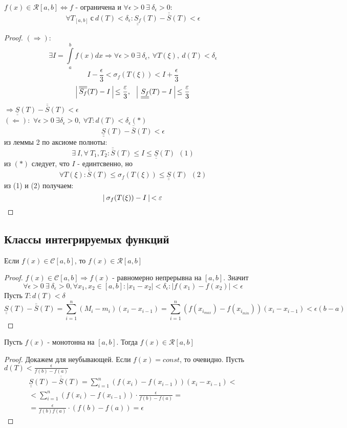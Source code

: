 \begin{theorem}
    $f(x)\in \mathcal{R}[a,b] \Leftrightarrow f$ - ограничена и $\forall \epsilon>0\ \exists\ \delta_{\epsilon}>0:$
    \[\forall T_{[a,b]}\ \text{с}\ d(T)<\delta_{\epsilon}: \underline{\underline{S_f}}(T)-\overline{\overline{S}}(T)<\epsilon\]
\end{theorem} 
\begin{proof}
    $(\Rightarrow):$
    \[\exists I=\int\limits_{a}^{b}f(x)dx \Rightarrow \forall \epsilon>0\ \exists\ \delta_{\epsilon},\ \forall T(\xi),\ d(T)<\delta_{\epsilon}\]
    \[I-\frac{\epsilon}{3}<\sigma_f(T(\xi))<I+\frac{\epsilon}{3}\]
    \[\vline\ \overline{\overline{S_f}}(T)-I\ \vline \leq \frac{\epsilon}{3},\ \ \  \vline\ \underline{\underline{S_f}}(T)-I\ \vline \leq \frac{\epsilon}{3}\]
    $\Rightarrow \underline{\underline{S}}(T)-\overline{\overline{S}}(T)<\epsilon$\\
    $(\Leftarrow):$
    $\forall \epsilon>0\ \exists \delta_{\epsilon}>0,\ \forall T: d(T)<\delta_{\epsilon} (*)$
    \[\underline{\underline{S}}(T)-\overline{\overline{S}}(T)<\epsilon\]
    из леммы 2 по аксиоме полноты: 
    \[\exists\ I, \forall\ T_1, T_2: \overline{\overline{S}}(T)\leq I\leq\underline{\underline{S}}(T)\ \ (1)\]
    из $(*)$ следует, что $I$ - единтсвенно, но 
    \[\forall T(\xi): \overline{\overline{S}}(T)\leq \sigma_f(T(\xi))\leq \underline{\underline{S}}(T)\ \ (2)\]
    из (1) и (2) получаем:
    \[\vline\ \sigma_f(T(\xi))-I \ \vline<\epsilon\]
\end{proof} 
\subsection{Классы интегрируемых функций}
\begin{theorem}
    Если $f(x)\in \mathcal{C}[a,b]$, то $f(x)\in \mathcal{R}[a,b]$
\end{theorem} 
\begin{proof}
    $f(x)\in \mathcal{C}[a,b] \Rightarrow f(x)$ - равномерно непрерывна на $[a,b]$. Значит 
    \[\forall \epsilon>0\ \exists\ \delta_{\epsilon}>0, \forall x_1, x_2\in [a,b]: |x_1-x_2|<\delta_{\epsilon}: |f(x_1)-f(x_2)|<\epsilon\]
    Пусть $T: d(T)<\delta$
    \[\underline{\underline{S}}(T)-\overline{\overline{S}}(T)=\sum\limits_{i=1}^{n}(M_i-m_i)(x_i-x_{i-1})=\sum\limits_{i=1}^{n}(f(x_{i_{max}})-f(x_{i_{min}}))(x_i-x_{i-1})<\epsilon(b-a)\]
\end{proof} 
\begin{theorem}
    Пусть $f(x)$ - монотонна на $[a,b]$. Тогда $f(x)\in \mathcal{R}[a,b]$
\end{theorem} 
\begin{proof}
    Докажем для неубывающей. Если $f(x)=const$, то очевидно.
    Пусть $d(T)<\frac{\epsilon}{f(b)-f(a)}$
    \begin{multline*}
        \underline{\underline{S}}(T)-\overline{\overline{S}}(T)=\sum\limits_{i=1}^{n}(f(x_i)-f(x_{i-1}))(x_i-x_{i-1})<\\
        <\sum\limits_{i=1}^{n}(f(x_i)-f(x_{i-1}))\cdot \frac{\epsilon}{f(b)-f(a)}=\\
        =\frac{\epsilon}{f(b)f(a)}\cdot (f(b)-f(a))=\epsilon
    \end{multline*}
\end{proof} 
